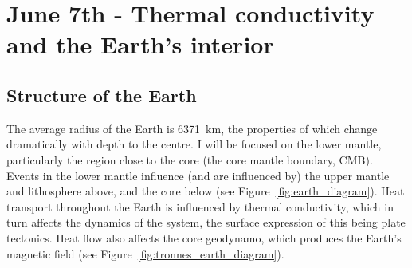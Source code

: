 \chapter{June 7th - Thermal conductivity and the Earth's interior} %

\label{Chapter1} %







\section{Structure of the Earth}
\label{sec:earth_structure}

The average radius of the Earth is 6371~km, the properties of which change dramatically with depth to the centre. I will be focused on the lower mantle, particularly the region close to the core (the core mantle boundary, CMB). Events in the lower mantle influence (and are influenced by) the upper mantle and lithosphere above, and the core below (see Figure~\ref{fig:earth_diagram}). Heat transport throughout the Earth is influenced by thermal conductivity, which in turn affects the dynamics of the system, the surface expression of this being plate tectonics. Heat flow also affects the core geodynamo, which produces the Earth's magnetic field (see Figure~\ref{fig:tronnes_earth_diagram}). 

